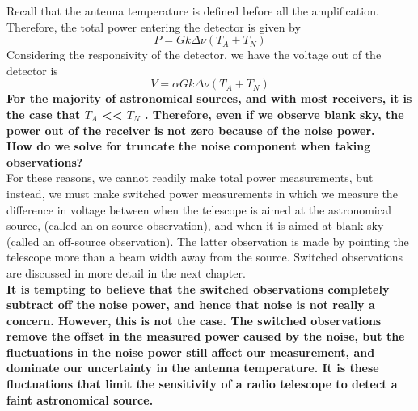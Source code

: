 \documentclass[10pt]{report}
\begin{document}
 Recall that the antenna temperature is defined before all the amplification.  Therefore, the total power entering the detector is given by 
 \begin{equation}
 P=Gk\Delta \nu (T_A+T_N)
 \end{equation}
 Considering the responsivity of the detector, we have the voltage out of the detector is
 \begin{equation}
 V=\alpha G k \Delta \nu (T_A+T_N)
 \end{equation}
 \textbf{For the majority of astronomical sources, and with most receivers, it is the case that $T_A$ << $T_N$ .  Therefore, even if we observe blank sky, the power out of the receiver is not zero because of the noise power. }\\
 \textbf{How do we solve for truncate the noise component when taking observations?}\\
  For these reasons, we cannot readily make total power measurements, but instead, we must make switched power measurements in which we measure the difference in voltage between when the telescope is aimed at the astronomical source, (called an on-source observation), and when it is aimed at blank sky (called an off-source observation). The latter 
 observation is made by pointing the telescope more than a beam width away from the source. Switched observations are discussed in more detail in the next chapter. \\
 \textbf{It is tempting to believe that the switched observations completely subtract off the noise power, and hence that noise is not really a concern. However, this is not the case.  The switched observations remove the offset in the measured power caused by the noise, but the fluctuations in the noise power still affect our measurement, and dominate our uncertainty in the antenna temperature.  It is these fluctuations that limit the sensitivity of a radio telescope to detect a faint astronomical source.}\\
\end{document}

